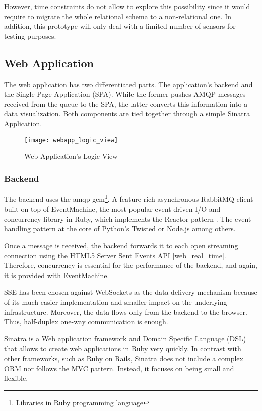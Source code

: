 However, time constraints do not allow to explore this possibility since it would require to migrate the whole relational schema to a non-relational one. In addition, this prototype will only deal with a limited number of sensors for testing purposes.

\subsection{Web Application}

The web application has two differentiated parts. The application's backend and the Single-Page Application (SPA). While the former pushes AMQP messages received from the queue to the SPA, the latter converts this information into a data visualization. Both components are tied together through a simple Sinatra Application.

\begin{figure}[h]
	\centering
	\texttt{[image: webapp\_logic\_view]}
	\caption{Web Application's Logic View}
	\label{fig:webapp_logic_view}
\end{figure}

\subsubsection{Backend}

The backend uses the amqp gem\footnote{Libraries in Ruby programming language}. A feature-rich asynchronous RabbitMQ client built on top of EventMachine, the most popular event-driven I/O and concurrency library in Ruby, which implements the Reactor pattern \cite{reactor}. The event handling pattern at the core of Python's Twisted or Node.js among others.

Once a message is received, the backend forwards it to each open streaming connection using the HTML5 Server Sent Events API \ref{web_real_time}. Therefore, concurrency is essential for the performance of the backend, and again, it is provided with EventMachine.

SSE has been chosen against WebSockets as the data delivery mechanism because of its much easier implementation and smaller impact on the underlying infrastructure. Moreover, the data flows only from the backend to the browser. Thus, half-duplex one-way communication is enough.

Sinatra is a Web application framework and Domain Specific Language (DSL) that allows to create web applications in Ruby very quickly. In contrast with other frameworks, such as Ruby on Rails, Sinatra does not include a complex ORM nor follows the MVC pattern. Instead, it focuses on being small and flexible.

